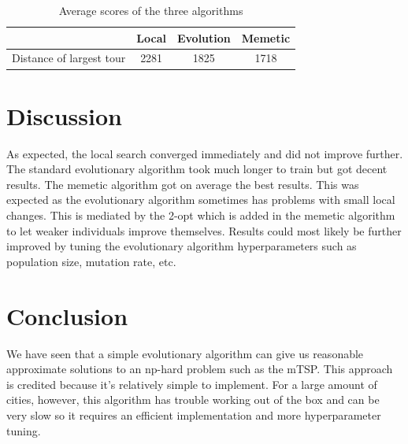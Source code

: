 \documentclass[journal]{IEEEtrancz}
\begin{document}
\begin{table}
  \centering
  \caption{Average scores of the three algorithms}
  \begin{tabular}{|l||c|c|c|}
  \hline
    & Local & Evolution & Memetic \\
  \hline
  \hline
  Distance of largest tour  & 2281 & 1825 & 1718 \\
  \hline
  \end{tabular}
  \label{tab:extab}
\end{table}


\section{Discussion}
As expected, the local search converged immediately and did not improve further. The standard evolutionary algorithm took much longer to train but got decent results. The memetic algorithm got on average the best results. This was expected as the evolutionary algorithm sometimes has problems with small local changes. This is mediated by the 2-opt which is added in the memetic algorithm to let weaker individuals improve themselves.
Results could most likely be further improved by tuning the evolutionary algorithm hyperparameters such as population size, mutation rate, etc. \\


\section{Conclusion}
We have seen that a simple evolutionary algorithm can give us reasonable approximate solutions to an np-hard problem such as the mTSP. This approach is credited because it's relatively simple to implement. For a large amount of cities, however, this algorithm has trouble working out of the box and can be very slow so it requires an efficient implementation and more hyperparameter tuning.
\end{document}
